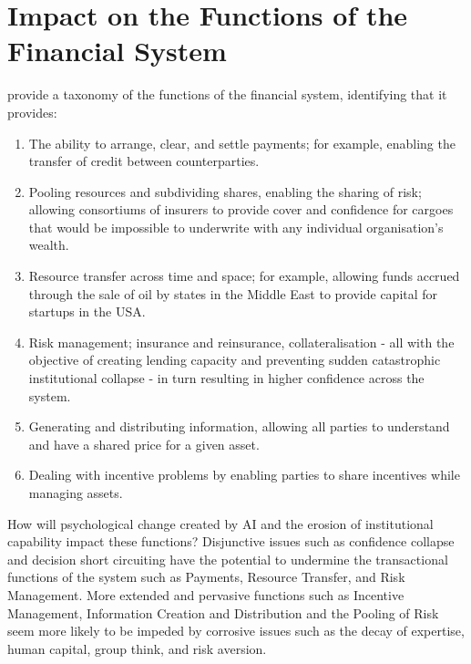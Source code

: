 \documentclass[11pt]{article}
\begin{document}
\section{Impact on the Functions of the Financial System} \label{sec:impact}
\citet{bodieConceptualFrameworkAnalyzing1998a} provide a taxonomy of the functions of the financial system, identifying that it provides:
\begin{enumerate}
\renewcommand{\labelenumi}{(\alph{enumi})}
\item The ability to arrange, clear, and settle payments; for example, enabling the transfer of credit between counterparties.
\item Pooling resources and subdividing shares, enabling the sharing of risk; allowing consortiums of insurers to provide cover and confidence for cargoes that would be impossible to underwrite with any individual organisation's wealth.
\item Resource transfer across time and space; for example, allowing funds accrued through the sale of oil by states in the Middle East to provide capital for startups in the USA.
\item Risk management; insurance and reinsurance, collateralisation - all with the objective of creating lending capacity and preventing sudden catastrophic institutional collapse - in turn resulting in higher confidence across the system. 
\item Generating and distributing information, allowing all parties to understand and have a shared price for a given asset.
\item Dealing with incentive problems by enabling parties to share incentives while managing assets.
\end{enumerate}

How will psychological change created by AI and the erosion of institutional capability impact these functions? 
Disjunctive issues such as confidence collapse and decision short circuiting have the potential to undermine the transactional functions of the system such as Payments, Resource Transfer, and Risk Management. More extended and pervasive functions such as Incentive Management, Information Creation and Distribution and the Pooling of Risk seem more likely to be impeded by corrosive issues such as the decay of expertise, human capital, group think, and risk aversion. 
\end{document}
